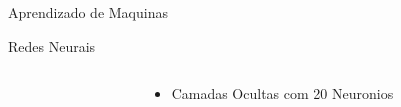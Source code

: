 \documentclass{beamer}
\begin{document}
\begin{frame}{Aprendizado de Maquinas}
\color{black}

\vspace{1cm}
\scalebox{.6}{

}
%

\end{frame}

\begin{frame}{Redes Neurais}
    \begin{columns}
        \begin{column}{0.5\textwidth}            
            \color{black}
            
            \vspace{1cm}
            \scalebox{.6}{
            
            
            }
            \end{column}
            \begin{column}{0.5\textwidth}
                \begin{itemize}
                    \item Camadas Ocultas com 20 Neuronios
                \end{itemize}
            \end{column}
    \end{columns}        
\end{frame}
\end{document}
